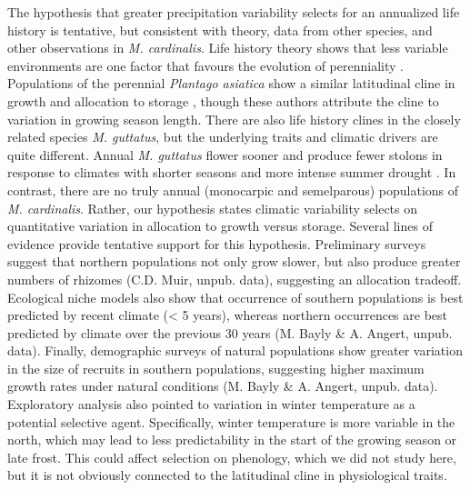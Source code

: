 \documentclass[11pt, oneside]{article}
\begin{document}
The hypothesis that greater precipitation variability selects for an annualized life history is tentative, but consistent with theory, data from other species, and other observations in \textit{M. cardinalis}. Life history theory shows that less variable environments are one factor that favours the evolution of perenniality \citep{Stearns_1976, Iwasa_Cohen_1989, Friedman_Rubin_2015}. Populations of the perennial \textit{Plantago asiatica} show a similar latitudinal cline in growth and allocation to storage \citep{Sawada_etal_1994}, though these authors attribute the cline to variation in growing season length. There are also life history clines in the closely related species \textit{M. guttatus}, but the underlying traits and climatic drivers are quite different. Annual \textit{M. guttatus} flower sooner and produce fewer stolons in response to climates with shorter seasons and more intense summer drought \citep{Lowry_Willis_2010, Friedman_etal_2015, Kooyers_etal_2015}. In contrast, there are no truly annual (monocarpic and semelparous) populations of \textit{M. cardinalis}. Rather, our hypothesis states climatic variability selects on quantitative variation in allocation to growth versus storage. Several lines of evidence provide tentative support for this hypothesis. Preliminary surveys suggest that northern populations not only grow slower, but also produce greater numbers of rhizomes (C.D. Muir, unpub. data), suggesting an allocation tradeoff. Ecological niche models also show that occurrence of southern populations is best predicted by recent climate (< 5 years), whereas northern occurrences are best predicted by climate over the previous 30 years (M. Bayly \& A. Angert, unpub. data). Finally, demographic surveys of natural populations show greater variation in the size of recruits in southern populations, suggesting higher maximum growth rates under natural conditions (M. Bayly \& A. Angert, unpub. data). Exploratory analysis also pointed to variation in winter temperature as a potential selective agent. Specifically, winter temperature is more variable in the north, which may lead to less predictability in the start of the growing season or late frost. This could affect selection on phenology, which we did not study here, but it is not obviously connected to the latitudinal cline in physiological traits.
\end{document}
